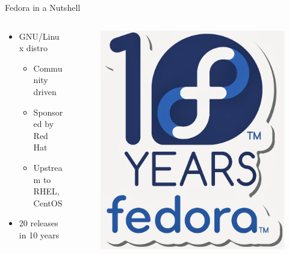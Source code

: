 \documentclass{beamer}
\begin{document}
\begin{frame}{Fedora in a Nutshell}
  \begin{columns}
    \begin{column}{.5\textwidth}
  \begin{itemize}
    \item GNU/Linux distro
      \begin{itemize}
        \item Community driven
        \item Sponsored by Red Hat
        \item Upstream to RHEL, CentOS
      \end{itemize}
    \item 20 releases in 10 years
  \end{itemize}
    \end{column}
    \begin{column}{.5\textwidth}
      \begin{figure}[htbp]
        \centering
        \includegraphics[width=.6\textwidth]{tenyears.jpeg}
      \end{figure}
    \end{column}
  \end{columns}
\end{frame}
\end{document}
